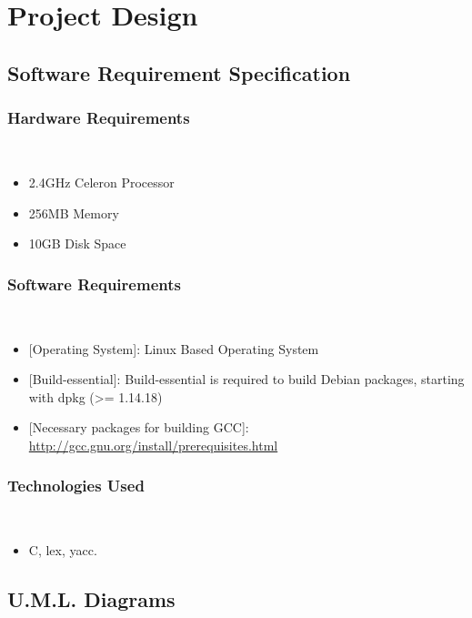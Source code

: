 \chapter{Project Design}

\section{Software Requirement Specification}

\subsection{Hardware Requirements}
\\
\begin{itemize}
\item {2.4GHz Celeron Processor}
\item {256MB Memory}
\item {10GB Disk Space}
\end{itemize}

\subsection{Software Requirements}
\\
\begin{itemize}
\item {[Operating System]: Linux Based Operating System}
\item {[Build-essential]: Build-essential is required to build Debian packages, starting with dpkg (\textgreater= 1.14.18)}
\item {[Necessary packages for building GCC]:\\ \url{http://gcc.gnu.org/install/prerequisites.html}}
\end{itemize}

\subsection{Technologies Used}
\\
\begin{itemize}
\item C, lex, yacc.
\end{itemize}
\newpage
\section{U.M.L. Diagrams}

